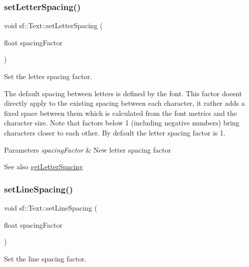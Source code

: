 \subsubsection{\texorpdfstring{setLetterSpacing()}{setLetterSpacing()}}
{\footnotesize\ttfamily void sf\+::\+Text\+::set\+Letter\+Spacing (\begin{DoxyParamCaption}\item[{float}]{spacing\+Factor }\end{DoxyParamCaption})}



Set the letter spacing factor. 

The default spacing between letters is defined by the font. This factor doesn\textquotesingle{}t directly apply to the existing spacing between each character, it rather adds a fixed space between them which is calculated from the font metrics and the character size. Note that factors below 1 (including negative numbers) bring characters closer to each other. By default the letter spacing factor is 1.


\begin{DoxyParams}{Parameters}
{\em spacing\+Factor} & New letter spacing factor\\
\hline
\end{DoxyParams}
\begin{DoxySeeAlso}{See also}
\mbox{\hyperlink{classsf_1_1_text_a028fc6e561bd9a0671254419b498b889}{get\+Letter\+Spacing}} \begin{DoxyVerb}\end{DoxyVerb}
 
\end{DoxySeeAlso}
\mbox{\label{classsf_1_1_text_af6505688f79e2e2d90bd68f4d767e965}} 
\subsubsection{\texorpdfstring{setLineSpacing()}{setLineSpacing()}}
{\footnotesize\ttfamily void sf\+::\+Text\+::set\+Line\+Spacing (\begin{DoxyParamCaption}\item[{float}]{spacing\+Factor }\end{DoxyParamCaption})}



Set the line spacing factor. 

